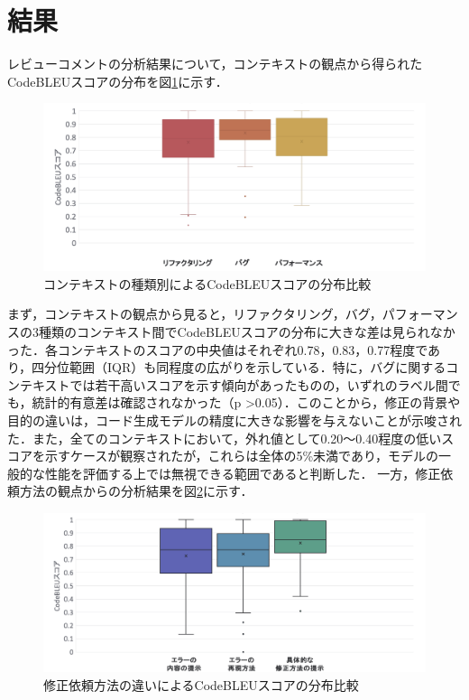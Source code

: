 \documentclass[11pt]{jreport}
\begin{document}
\section{結果}
レビューコメントの分析結果について，コンテキストの観点から得られたCodeBLEUスコアの分布を図\ref{fig:context-score}に示す．
\begin{figure}[htbp]
\centering
\includegraphics[width=0.8\linewidth]{@BSthesis2024_Akamatsu/Akamatsu_figs/rq1_result02_03.png}
\caption{コンテキストの種類別によるCodeBLEUスコアの分布比較}
\label{fig:context-score}
\end{figure}
まず，コンテキストの観点から見ると，リファクタリング，バグ，パフォーマンスの3種類のコンテキスト間でCodeBLEUスコアの分布に大きな差は見られなかった．各コンテキストのスコアの中央値はそれぞれ0.78，0.83，0.77程度であり，四分位範囲（IQR）も同程度の広がりを示している．特に，バグに関するコンテキストでは若干高いスコアを示す傾向があったものの，いずれのラベル間でも，統計的有意差は確認されなかった（p \textgreater 0.05）．このことから，修正の背景や目的の違いは，コード生成モデルの精度に大きな影響を与えないことが示唆された．また，全てのコンテキストにおいて，外れ値として0.20〜0.40程度の低いスコアを示すケースが観察されたが，これらは全体の5\%未満であり，モデルの一般的な性能を評価する上では無視できる範囲であると判断した．
一方，修正依頼方法の観点からの分析結果を図\ref{fig:method-score}に示す．
\begin{figure}[htbp]
\centering
\includegraphics[width=0.8\linewidth]{@BSthesis2024_Akamatsu/Akamatsu_figs/rq1_result03_03.png}
\caption{修正依頼方法の違いによるCodeBLEUスコアの分布比較}
\label{fig:method-score}
\end{figure}
\end{document}
